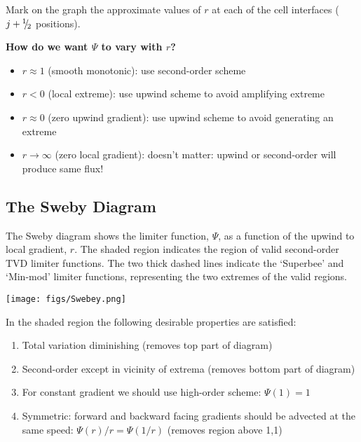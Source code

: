 \begin{minipage}[t]{0.55\linewidth}
\raggedright
Mark on the graph the approximate values of $r$ at each of the cell interfaces ($j+{^1\negthickspace/\negthinspace_2}$ positions).
\\

\end{minipage}
\hfill
\begin{minipage}[t]{0.44\linewidth}
\centerline{\bf How do we want $\Psi$ to vary with $r$?\\}

\begin{itemize}\raggedright
\item $r\approx 1$ (smooth monotonic): use second-order scheme
\item $r< 0$ (local extreme): use upwind scheme to avoid amplifying extreme
\item $r\approx 0$ (zero upwind gradient): use upwind scheme to avoid generating an extreme
\item $r \rightarrow\infty$ (zero local gradient): doesn't matter: upwind or second-order will produce same flux!
\end{itemize}
\end{minipage}

\clearpage
\subsection{The Sweby Diagram}

The Sweby diagram shows the limiter function, $\Psi$, as a function of the upwind to local gradient, $r$. The shaded region indicates the region of valid second-order TVD limiter functions. The two thick dashed lines indicate the ‘Superbee’ and ‘Min-mod’ limiter functions, representing the two extremes
of the valid regions.

\begin{minipage}{0.45\linewidth}
\texttt{[image: figs/Swebey.png]}
\end{minipage}
\hfill
\begin{minipage}{0.52\linewidth}\raggedright

In the shaded region the following desirable properties are satisfied:

\begin{enumerate}\raggedright
\item Total variation diminishing (removes top part of diagram)
\item Second-order except in vicinity of extrema (removes bottom part of diagram)
\item For constant gradient we should use high-order scheme: $\Psi(1) = 1$
\item Symmetric: forward and backward facing gradients should be advected at the same speed: $\Psi(r)/r = \Psi(1/r)$ (removes region above 1,1)
\end{enumerate}
\end{minipage}

